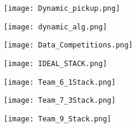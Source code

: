\documentclass{article}
\begin{document}
\begin{figure}[h]
\centering
\texttt{[image: Dynamic\_pickup.png]}
\caption{}
\label{dyn}
\end{figure}

\begin{figure}[h]
\centering
\texttt{[image: dynamic\_alg.png]}
\caption{}
\label{dyn_alg}
\end{figure}

\begin{figure}[h]
\centering
\texttt{[image: Data\_Competitions.png]}
\caption{}
\label{data}
\end{figure}

\begin{figure}[h]
\centering
\texttt{[image: IDEAL\_STACK.png]}
\caption{}
\label{ideal}
\end{figure}

\begin{figure}[h]
\centering
\texttt{[image: Team\_6\_1Stack.png]}
\caption{}
\label{t6}
\end{figure}

\begin{figure}[h]
\centering
\texttt{[image: Team\_7\_3Stack.png]}
\caption{}
\label{t7}
\end{figure}

\begin{figure}[h]
\centering
\texttt{[image: Team\_9\_Stack.png]}
\caption{}
\label{t9}
\end{figure}
\end{document}
